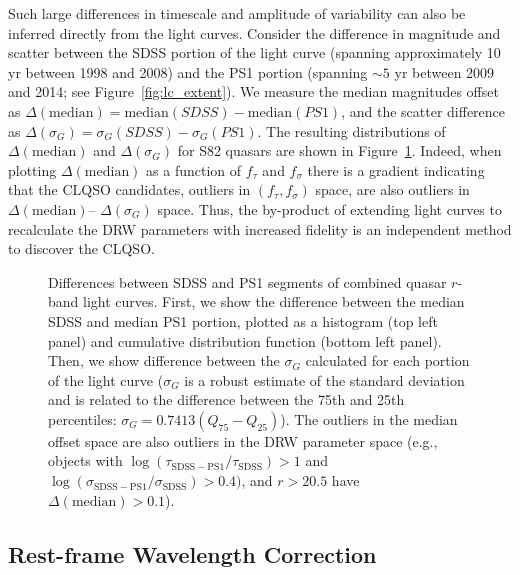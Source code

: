 \documentclass[twocolumn]{aastex62}
\begin{document}
Such large differences in timescale and amplitude of variability can also be inferred directly from the light curves. Consider the difference in magnitude and scatter between the SDSS portion of the light curve (spanning approximately 10 yr between 1998 and 2008) and the PS1 portion (spanning ${\sim}5$ yr between 2009 and 2014; see Figure~\ref{fig:lc_extent}). We measure the median magnitudes offset as $\Delta(\mathrm{median}) =  \mathrm{median}(SDSS) - \mathrm{median}(PS1)$, and the scatter difference as $\Delta(\sigma_{G}) = \sigma_{G}(SDSS)-\sigma_{G}(PS1)$. The resulting distributions of  $\Delta(\mathrm{median}) $ and $\Delta(\sigma_{G})$ for S82 quasars are shown in Figure~\ref{fig:median_offsets}. Indeed, when plotting $\Delta(\mathrm{median})$ as a function of $f_{\tau}$ and $f_{\sigma}$ there is a gradient indicating that the  CLQSO candidates, outliers in $(f_{\tau}, f_{\sigma})$ space, are also outliers in $\Delta(\mathrm{median})$-- $\Delta(\sigma_{G})$ space. Thus, the by-product of extending light curves to recalculate the DRW parameters with increased fidelity is an independent method to discover the CLQSO. 

\begin{figure} 
	\caption{Differences between SDSS and PS1 segments of combined quasar $r$-band light curves. First, we show the difference between the median SDSS and median PS1 portion, plotted as a histogram (top left panel) and cumulative distribution function (bottom left panel). Then, we show difference between the $\sigma_{G}$ calculated for each portion of the light curve ($\sigma_{G}$ is a robust estimate of the standard deviation and is related to the difference between the 75th and 25th percentiles: $\sigma_{G} = 0.7413(Q_{75} - Q_{25})$). The outliers in the median offset space are also outliers in the DRW parameter space (e.g., objects with $\log{(\tau_{\mathrm{SDSS-PS1}} /  \tau_{\mathrm{SDSS}})} > 1$ and $\log{(\sigma_{\mathrm{SDSS-PS1}} / \sigma_{\mathrm{SDSS}})}   > 0.4  )$, and $r > 20.5$ have $\Delta(\mathrm{median}) > 0.1$).}
	\label{fig:median_offsets}
\end{figure}




\subsection{Rest-frame Wavelength Correction}
\end{document}

